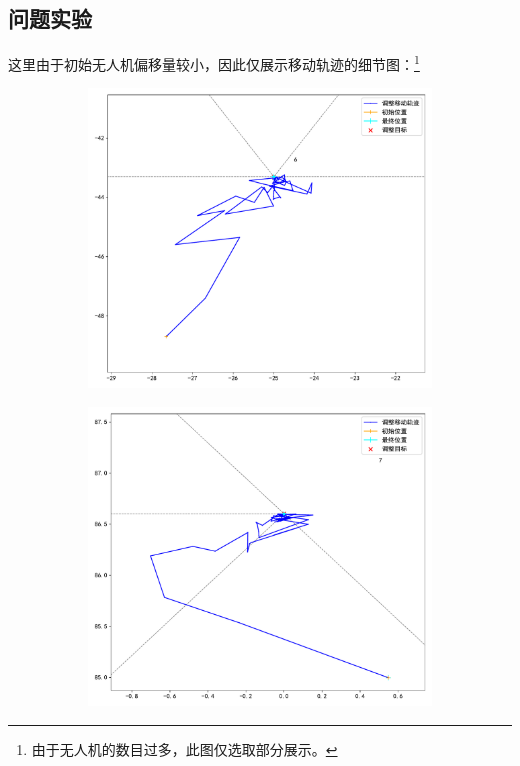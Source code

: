 \documentclass[withoutpreface,bwprint]{cumcmthesis} %
\begin{document}
\subsection{问题实验}

这里由于初始无人机偏移量较小，因此仅展示移动轨迹的细节图：\footnote{由于无人机的数目过多，此图仅选取部分展示。}
\begin{figure}[H]
    \centering
    \begin{subfigure}{0.45\linewidth}
        \includegraphics[width=1.0\linewidth]{figures/t_6.pdf}
    \end{subfigure}
    \begin{subfigure}{0.45\linewidth}
        \includegraphics[width=1.0\linewidth]{figures/t_7.pdf}

\end{subfigure}
\end{figure}
\end{document}
